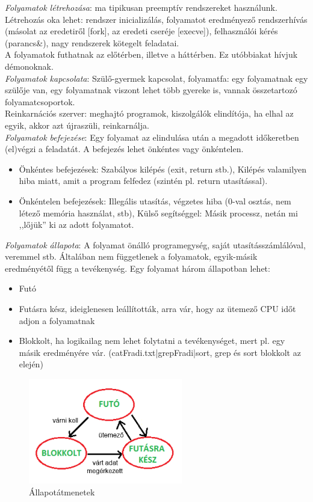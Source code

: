 \documentclass[margin=0px]{article}
\begin{document}
\textit{Folyamatok létrehozása}: ma tipikusan preemptív rendszereket használunk. Létrehozás oka lehet: rendszer inicializálás, folyamatot eredményező rendszerhívás (másolat az eredetiről [fork], az eredeti cseréje [execve]), felhasználói kérés (parancs\&), nagy rendszerek kötegelt feladatai. \\
A folyamatok futhatnak az előtérben, illetve a háttérben. Ez utóbbiakat hívjuk démonoknak.\\
\textit{Folyamatok kapcsolata}: Szülő-gyermek kapcsolat, folyamatfa: egy folyamatnak egy szülője van, egy folyamatnak viszont lehet több gyereke is, vannak összetartozó folyamatcsoportok. \\ Reinkarnációs szerver: meghajtó programok, kiszolgálók elindítója, ha elhal az egyik, akkor azt újraszüli, reinkarnálja. \\
\textit{Folyamatok befejezése}: Egy folyamat az elindulása után a megadott időkeretben (el)végzi a feladatát. A befejezés lehet önkéntes vagy önkéntelen.
\begin{itemize}
    \item Önkéntes befejezések: Szabályos kilépés (exit, return stb.), Kilépés valamilyen hiba miatt, amit a program felfedez (szintén pl. return utasítással).
    \item Önkéntelen befejezések: Illegális utasítás, végzetes hiba (0-val osztás, nem létező memória használat, stb), Külső segítséggel: Másik processz, netán mi ,,lőjük” ki az adott folyamatot.
\end{itemize}
\textit{Folyamatok állapota}: A folyamat önálló programegység, saját utasításszámlálóval, veremmel stb. Általában nem függetlenek a folyamatok, egyik-másik eredményétől függ a tevékenység. Egy folyamat három állapotban lehet:
\begin{itemize}
    \item Futó
    \item Futásra kész, ideiglenesen leállították, arra vár, hogy az ütemező CPU időt adjon a folyamatnak
    \item Blokkolt, ha logikailag nem lehet folytatni a tevékenységet, mert pl. egy másik eredményére vár. (catFradi.txt|grepFradi|sort, grep és sort blokkolt az elején)
\end{itemize}
\begin{figure}[H]
    \centering
    \includegraphics[width=0.6\textwidth]{img/allapot.png}
    \caption{Állapotátmenetek}
\end{figure}
\end{document}
